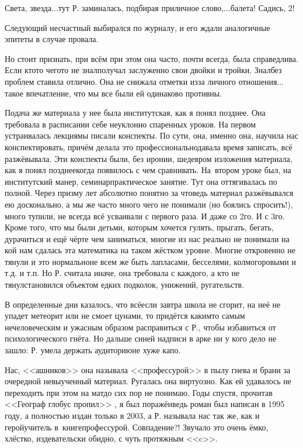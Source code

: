 \diagdash Света, звезда$\ldots$\mdash тут Р. заминалась, подбирая приличное слово,\mdash $\ldots$балета! Садись, 2!

Следующий несчастный выбирался по журналу, и его ждали аналогичные эпитеты в случае провала.	

Но стоит признать, при всём при этом она часто, почти всегда, была справедлива. Если кто\sdash то чего\sdash то не знал\mdash получал заслуженно свои двойки и тройки. Знал\mdash без проблем ставила отлично. Она не снижала отметки из\sdash за личного отношения$\ldots$ такое впечатление, что мы все были ей одинаково противны. 

Подача же материала у нее была институтская, как я понял позднее. Она требовала в расписании себе неуклонно спаренных уроков. На первом устраивалась лекция\mdash мы писали конспекты. По сути, она, именно она, научила нас конспектировать, причём делала это профессионально\mdash давала время записать, всё разжёвывала. Эти конспекты были, без иронии, шедевром изложения материала, как я понял позднее\mdash когда появилось с чем сравнивать. На~втором уроке был, на институтский манер, семинар\mdash практическое занятие. Тут она оттягивалась по полной. Через призму лет абсолютно понятно за что\mdash ведь материал разжёвывался ею досконально, а мы же часто много чего не понимали (но боялись спросить!), много тупили, не всегда всё усваивали с  первого раза. И даже со 2\sdash го. И с 3\sdash го. Кроме того, что мы были детьми, которым хочется гулять, прыгать, бегать, дурачиться и ещё чёрте чем заниматься, многие из нас реально не понимали на кой нам сдалась эта математика на таком жёстком уровне. Многие откровенно не тянули и это нормально\mdash не всем же быть лапласами, бесселями, колмогоровыми и т.д. и т.п. Но Р. считала иначе, она требовала с каждого, а кто не тянул\mdash становился объектом едких подколок, унижений, ругательств.

В определенные дни казалось, что всё\mdash если завтра школа не сгорит, на неё не упадет метеорит или не смоет цунами, то придётся каким\sdash то самым нечеловеческим и ужасным образом расправиться с Р., чтобы избавиться от психологического гнёта. Но дальше синей надписи в арке ни у кого дело не зашло: Р. умела держать аудиторию\mdash не хуже капо.

Нас, <<ашников>> она называла <<профессурой>> в пылу гнева и брани за очередной невыученный материал. Ругалась она виртуозно. Как ей удавалось не переходить при этом на мат\mdash до сих пор не понимаю. Годы спустя, прочитав <<Географ глобус пропил>> \cite{ГеографГлобусПропил}, я был поражён\mdash ведь роман был написан в 1995 году, а полностью издан только в 2003, а Р. называла нас так же, как и герой\sdash учитель в~книге\mdash профессурой. Совпадение?! Звучало это очень ёмко, хлёстко, издевательски обидно, с чуть протяжным <<c>>.

